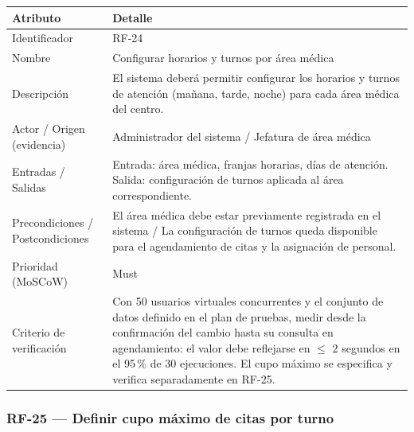 \documentclass[11pt,a4paper]{article}
\begin{document}
	\begin{longtable}{p{} p{}}
		
		\toprule
		\textbf{Atributo} & \textbf{Detalle} \\
		\midrule
		\endhead
		
		Identificador & RF-24 \\
		Nombre & Configurar horarios y turnos por área médica \\
		Descripción & El sistema deberá permitir configurar los horarios y turnos de atención (mañana, tarde, noche) para cada área médica del centro. \\
		Actor / Origen (evidencia) & Administrador del sistema / Jefatura de área médica \\
		Entradas / Salidas & Entrada: área médica, franjas horarias, días de atención. Salida: configuración de turnos aplicada al área correspondiente. \\
		Precondiciones / Postcondiciones & El área médica debe estar previamente registrada en el sistema / La configuración de turnos queda disponible para el agendamiento de citas y la asignación de personal. \\
		Prioridad (MoSCoW) & Must \\
		Criterio de verificación & Con 50 usuarios virtuales concurrentes y el conjunto de datos definido en el plan de pruebas, medir desde la confirmación del cambio hasta su consulta en agendamiento: el valor debe reflejarse en \(\leq\) 2 segundos en el 95\,\% de 30 ejecuciones. El cupo máximo se especifica y verifica separadamente en RF-25. \\
		\bottomrule
	\end{longtable}
	
	\subsubsection{RF-25 --- Definir cupo máximo de citas por turno}
	
\end{document}
